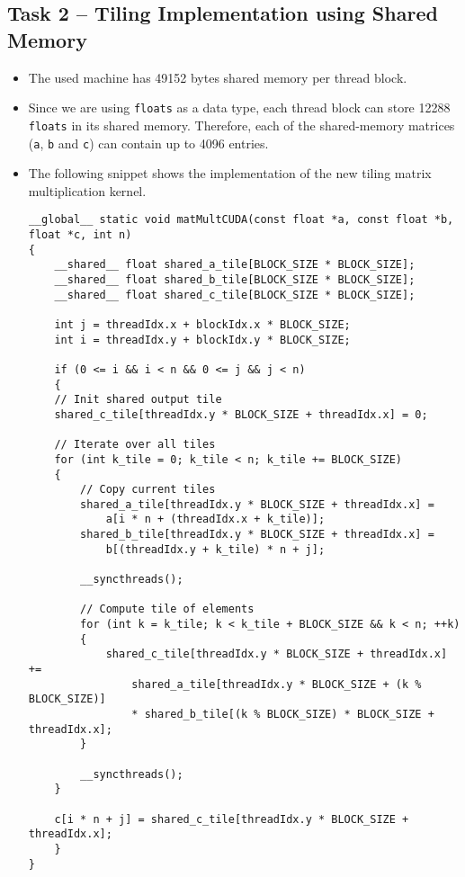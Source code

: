\documentclass[a4paper, DIV12, headsepline]{scrartcl}
\begin{document}
\subsection*{Task 2 -- Tiling Implementation using Shared Memory}
\begin{itemize}
\item The used machine has 49152 bytes shared memory per thread block.

\item Since we are using \texttt{floats} as a data type, each thread block can store 12288 \texttt{floats} in its shared memory. Therefore, each of the shared-memory matrices (\texttt{a}, \texttt{b} and \texttt{c}) can contain up to 4096 entries.

\item The following snippet shows the implementation of the new tiling matrix multiplication kernel.
\begin{verbatim}
__global__ static void matMultCUDA(const float *a, const float *b, float *c, int n)
{
    __shared__ float shared_a_tile[BLOCK_SIZE * BLOCK_SIZE];
    __shared__ float shared_b_tile[BLOCK_SIZE * BLOCK_SIZE];
    __shared__ float shared_c_tile[BLOCK_SIZE * BLOCK_SIZE];

    int j = threadIdx.x + blockIdx.x * BLOCK_SIZE;
    int i = threadIdx.y + blockIdx.y * BLOCK_SIZE;

    if (0 <= i && i < n && 0 <= j && j < n)
    {
    // Init shared output tile
    shared_c_tile[threadIdx.y * BLOCK_SIZE + threadIdx.x] = 0;

    // Iterate over all tiles
    for (int k_tile = 0; k_tile < n; k_tile += BLOCK_SIZE)
    {
        // Copy current tiles
        shared_a_tile[threadIdx.y * BLOCK_SIZE + threadIdx.x] = 
            a[i * n + (threadIdx.x + k_tile)];
        shared_b_tile[threadIdx.y * BLOCK_SIZE + threadIdx.x] = 
            b[(threadIdx.y + k_tile) * n + j];

        __syncthreads();

        // Compute tile of elements
        for (int k = k_tile; k < k_tile + BLOCK_SIZE && k < n; ++k)
        {
            shared_c_tile[threadIdx.y * BLOCK_SIZE + threadIdx.x] += 
                shared_a_tile[threadIdx.y * BLOCK_SIZE + (k % BLOCK_SIZE)] 
                * shared_b_tile[(k % BLOCK_SIZE) * BLOCK_SIZE + threadIdx.x];
        }

        __syncthreads();
    }

    c[i * n + j] = shared_c_tile[threadIdx.y * BLOCK_SIZE + threadIdx.x];
    }
}
\end{verbatim}


\end{itemize}
\end{document}
